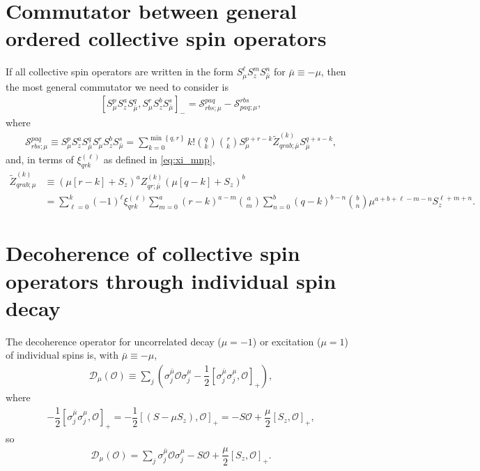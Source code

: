 \documentclass[aps,notitlepage,nofootinbib,11pt]{revtex4-1}
\newcommand{\f}[2]{\dfrac{#1}{#2}} %
\newcommand{\p}[1]{\left(#1\right)} %
\renewcommand{\sp}[1]{\left[#1\right]} %
\renewcommand{\set}[1]{\left\{#1\right\}} %
\newcommand{\D}{\mathcal{D}}
\renewcommand{\O}{\mathcal{O}}
\renewcommand{\S}{\mathcal{S}}
\newcommand{\bmu}{{\bar\mu}}
\newcommand{\1}{\mathds{1}}
\begin{document}
\section{Commutator between general ordered collective spin operators}
\label{sec:comm_general}

If all collective spin operators are written in the form
$S_\mu^\ell S_z^m S_\bmu^n$ for $\bmu\equiv-\mu$, then the most
general commutator we need to consider is
\begin{align}
  \sp{S_\mu^p S_z^a S_\bmu^q, S_\mu^r S_z^b S_\bmu^s}_-
  = \S^{paq}_{rbs;\mu} - \S^{rbs}_{paq;\mu},
\end{align}
where
\begin{align}
  \S^{paq}_{rbs;\mu}
  \equiv S_\mu^p S_z^a S_\bmu^q S_\mu^r S_z^b S_\bmu^s
  = \sum_{k=0}^{\min\set{q,r}} k! { q \choose k } { r \choose k }
  S_\mu^{p+r-k} \tilde Z_{qrab;\bmu}^{(k)} S_\bmu^{q+s-k},
\end{align}
and, in terms of $\xi_{qrk}^{(\ell)}$ as defined in \eqref{eq:xi_mnp},
\begin{align}
  \tilde Z_{qrab;\mu}^{(k)}
  &\equiv \p{\mu\sp{r-k}+S_z}^a
  Z_{qr;\bmu}^{(k)} \p{\mu\sp{q-k}+S_z}^b \\
  &= \sum_{\ell=0}^k \p{-1}^\ell \xi_{qrk}^{(\ell)}
  \sum_{m=0}^a \p{r-k}^{a-m} { a \choose m }
  \sum_{n=0}^b \p{q-k}^{b-n} { b \choose n }
  \mu^{a+b+\ell-m-n} S_z^{\ell+m+n}.
\end{align}


\section{Decoherence of collective spin operators through individual
  spin decay}
\label{sec:decoherence}

The decoherence operator for uncorrelated decay ($\mu=-1$) or
excitation ($\mu=1$) of individual spins is, with $\bmu\equiv-\mu$,
\begin{align}
  \D_\mu\p{\O}
  \equiv \sum_j\p{\sigma_j^\bmu \O \sigma_j^\mu
    - \f12\sp{\sigma_j^\bmu \sigma_j^\mu,\O}_+},
\end{align}
where
\begin{align}
  -\f12 \sp{\sigma_j^\bmu \sigma_j^\mu,\O}_+
  = -\f12\sp{\p{S-\mu S_z}, \O}_+
  = -S\O + \f{\mu}{2} \sp{S_z, \O}_+,
\end{align}
so
\begin{align}
  \D_\mu\p{\O}
  = \sum_j\sigma_j^\bmu \O \sigma_j^\mu
    - S \O + \f{\mu}{2} \sp{S_z, \O}_+.
  \label{eq:D_mu}
\end{align}
\end{document}
